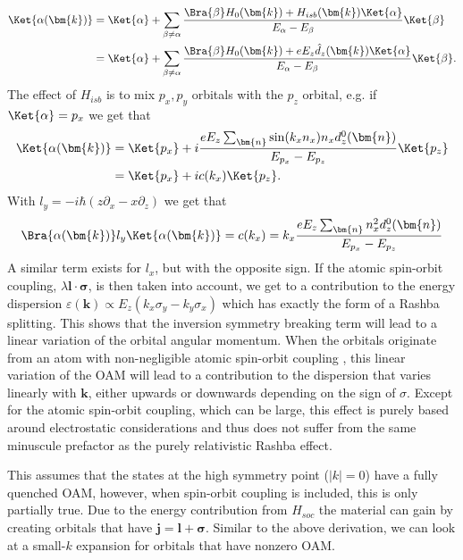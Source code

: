 \begin{align}
	\Ket{\alpha(\bm{k})}&=\Ket{\alpha} + \sum_{\beta \neq \alpha} \frac{\Bra{\beta} H_0(\bm{k}) + H_{isb}(\bm{k}) \Ket{\alpha}}{E_{\alpha} - E_{\beta}} \Ket{\beta}\\
	&=\Ket{\alpha} + \sum_{\beta \neq \alpha} \frac{\Bra{\beta} H_0(\bm{k}) + e E_z \hat{d}_z(\bm{k}) \Ket{\alpha}}{E_{\alpha} - E_{\beta}} \Ket{\beta}.
\end{align}
The effect of $H_{isb}$ is to mix $p_x, p_y$ orbitals with the $p_z$ orbital, e.g. if $\Ket{\alpha} = p_x$ we get that
\begin{align}
	\Ket{\alpha(\bm{k})} &= \Ket{p_x} + i \frac{e E_z \sum_{\bm{n}} \sin(k_x n_x)n_x d_z^0(\bm{n})}{E_{p_x} - E_{p_z}} \Ket{p_z}\\
	&=\Ket{p_x} + i c(k_x) \Ket{p_z}.
\end{align}
With $l_y = -i\hbar(z \partial_x - x \partial_z )$ we get that
\begin{equation}
	\label{eq:oam_from_k}
	\Bra{\alpha(\bm{k})} l_y \Ket{\alpha(\bm{k})} = c(k_x) = k_x \frac{e E_z \sum_{\bm{n}} n_x^2d_z^0(\bm{n})}{E_{p_x} - E_{p_z}}
\end{equation}
A similar term exists for $l_x$, but with the opposite sign. If the atomic spin-orbit coupling, $\lambda \bm{l}\cdot\bm{\sigma}$, is then taken into account, we get to a contribution to the energy dispersion $\varepsilon(\bm{k}) \propto E_z (k_x \sigma_y - k_y \sigma_x)$ which has exactly the form of a Rashba splitting. 
This shows that the inversion symmetry breaking term will lead to a linear variation of the orbital angular momentum. When the orbitals originate from an atom with non-negligible atomic spin-orbit coupling , this linear variation of the OAM will lead to a contribution to the dispersion that varies linearly with $\bm{k}$, either upwards or downwards depending on the sign of $\sigma$. Except for the atomic spin-orbit coupling, which can be large, this effect is purely based around electrostatic considerations and thus does not suffer from the same minuscule prefactor as the purely relativistic Rashba effect.

This assumes that the states at the high symmetry point ($|k|=0$) have a fully quenched OAM, however, when spin-orbit coupling is included, this is only partially true. Due to the energy contribution from $H_{soc}$ the material can gain by creating orbitals that have $\bm{j} = \bm{l} + \bm{\sigma}$. Similar to the above derivation, we can look at a small-$k$ expansion for orbitals that have nonzero OAM.

